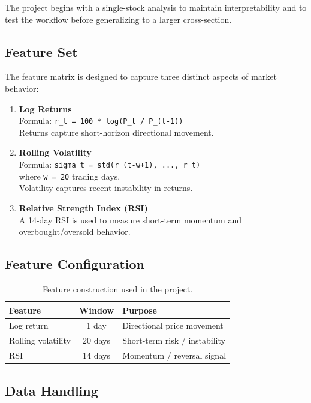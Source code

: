 \documentclass[11pt,a4paper]{article}
\begin{document}
The project begins with a single-stock analysis to maintain interpretability and to test the workflow before generalizing to a larger cross-section.

\subsection{Feature Set}

The feature matrix is designed to capture three distinct aspects of market behavior:

\begin{enumerate}[label=\arabic*.]
    \item \textbf{Log Returns} \\
    Formula: \texttt{r\_t = 100 * log(P\_t / P\_(t-1))} \\
    Returns capture short-horizon directional movement.

    \item \textbf{Rolling Volatility} \\
    Formula: \texttt{sigma\_t = std(r\_(t-w+1), ..., r\_t)} \\
    where \texttt{w = 20} trading days. \\
    Volatility captures recent instability in returns.

    \item \textbf{Relative Strength Index (RSI)} \\
    A 14-day RSI is used to measure short-term momentum and overbought/oversold behavior.
\end{enumerate}

\subsection{Feature Configuration}

\begin{table}[H]
\centering
\begin{tabular}{lcl}
\toprule
Feature & Window & Purpose \\
\midrule
Log return & 1 day & Directional price movement \\
Rolling volatility & 20 days & Short-term risk / instability \\
RSI & 14 days & Momentum / reversal signal \\
\bottomrule
\end{tabular}
\caption{Feature construction used in the project.}
\end{table}

\subsection{Data Handling}
\end{document}

